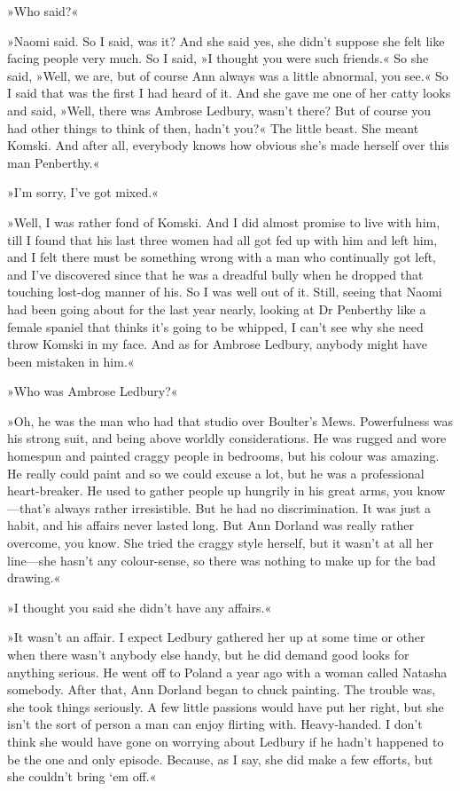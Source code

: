 »Who said?«

»Naomi said. So I said, was it? And she said yes, she didn't suppose she felt like facing people very much. So I said, »I thought you were such friends.« So she said, »Well, we are, but of course Ann always was a little abnormal, you see.« So I said that was the first I had heard of it. And she gave me one of her catty looks and said, »Well, there was Ambrose Ledbury, wasn't there? But of course you had other things to think of then, hadn't you?« The little beast. She meant Komski. And after all, everybody knows how obvious she's made herself over this man Penberthy.«

»I'm sorry, I've got mixed.«

»Well, I was rather fond of Komski. And I did almost promise to live with him, till I found that his last three women had all got fed up with him and left him, and I felt there must be something wrong with a man who continually got left, and I've discovered since that he was a dreadful bully when he dropped that touching lost-dog manner of his. So I was well out of it. Still, seeing that Naomi had been going about for the last year nearly, looking at Dr Penberthy like a female spaniel that thinks it's going to be whipped, I can't see why she need throw Komski in my face. And as for Ambrose Ledbury, anybody might have been mistaken in him.«

»Who was Ambrose Ledbury?«

»Oh, he was the man who had that studio over Boulter's Mews. Powerfulness was his strong suit, and being above worldly considerations. He was rugged and wore homespun and painted craggy people in bedrooms, but his colour was amazing. He really could paint and so we could excuse a lot, but he was a professional heart-breaker. He used to gather people up hungrily in his great arms, you know—that's always rather irresistible. But he had no discrimination. It was just a habit, and his affairs never lasted long. But Ann Dorland was really rather overcome, you know. She tried the craggy style herself, but it wasn't at all her line—she hasn't any colour-sense, so there was nothing to make up for the bad drawing.«

»I thought you said she didn't have any affairs.«

»It wasn't an affair. I expect Ledbury gathered her up at some time or other when there wasn't anybody else handy, but he did demand good looks for anything serious. He went off to Poland a year ago with a woman called Natasha somebody. After that, Ann Dorland began to chuck painting. The trouble was, she took things seriously. A few little passions would have put her right, but she isn't the sort of person a man can enjoy flirting with. Heavy-handed. I don't think she would have gone on worrying about Ledbury if he hadn't happened to be the one and only episode. Because, as I say, she did make a few efforts, but she couldn't bring `em off.«

